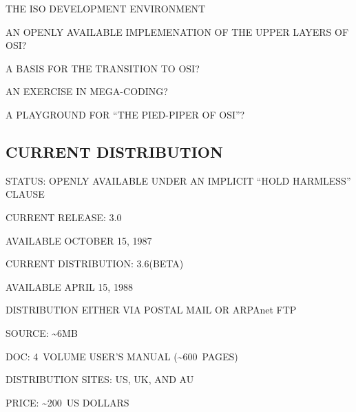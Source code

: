 \begin{bwslide}

\begin{nrtc}
\item	THE ISO DEVELOPMENT ENVIRONMENT

\item	AN OPENLY AVAILABLE IMPLEMENATION OF THE UPPER LAYERS OF OSI?

\item	A BASIS FOR THE TRANSITION TO OSI?

\item	AN EXERCISE IN MEGA-CODING?

\item	A PLAYGROUND FOR ``THE PIED-PIPER OF OSI''?
\end{nrtc}
\end{bwslide}


\begin{bwslide}
\part*	{CURRENT DISTRIBUTION}\bf

\begin{nrtc}
\item	STATUS: OPENLY AVAILABLE UNDER AN IMPLICIT ``HOLD HARMLESS'' CLAUSE

\item	CURRENT RELEASE: 3.0
    \begin{nrtc}
    \item	AVAILABLE OCTOBER 15, 1987
    \end{nrtc}

\item	CURRENT DISTRIBUTION: 3.6(BETA)
    \begin{nrtc}
    \item	AVAILABLE APRIL 15, 1988
    \end{nrtc}

\item	DISTRIBUTION EITHER VIA POSTAL MAIL OR ARPAnet FTP
    \begin{nrtc}
    \item	SOURCE: \~{}6MB

    \item	DOC: 4~VOLUME USER'S MANUAL (\~{}600~PAGES)

    \item	DISTRIBUTION SITES: US, UK, AND AU

    \item	PRICE: \~{}200~US DOLLARS
    \end{nrtc}
\end{nrtc}
\end{bwslide}


